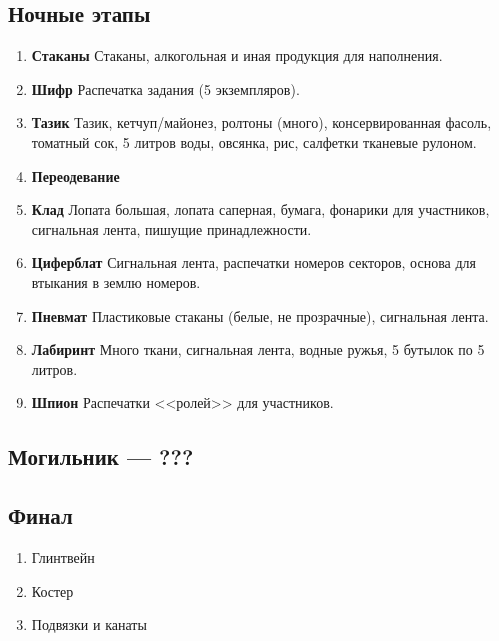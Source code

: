\subsection*{Ночные этапы}
	\begin{enumerate}
	\item \textbf{Стаканы} Стаканы, алкогольная и иная продукция для наполнения.
	\item \textbf{Шифр} Распечатка задания (5 экземпляров).
	\item \textbf{Тазик} Тазик, кетчуп/майонез, ролтоны (много), консервированная фасоль, томатный сок, 5 литров воды, овсянка, рис, салфетки тканевые рулоном.
	\item \textbf{Переодевание}
	\item \textbf{Клад} Лопата большая, лопата саперная, бумага, фонарики для участников, сигнальная лента, пишущие принадлежности.
	\item \textbf{Циферблат} Сигнальная лента, распечатки номеров секторов, основа для втыкания в землю номеров.
	\item \textbf{Пневмат} Пластиковые стаканы (белые, не прозрачные), сигнальная лента.
	\item \textbf{Лабиринт} Много ткани, сигнальная лента, водные ружья, 5 бутылок по 5 литров.
	\item \textbf{Шпион} Распечатки <<ролей>> для участников.
	\end{enumerate}
	
\subsection*{Могильник --- ???}

\subsection*{Финал}
	\begin{enumerate}
	\item Глинтвейн
	\item Костер
	\item Подвязки и канаты
	\end{enumerate}